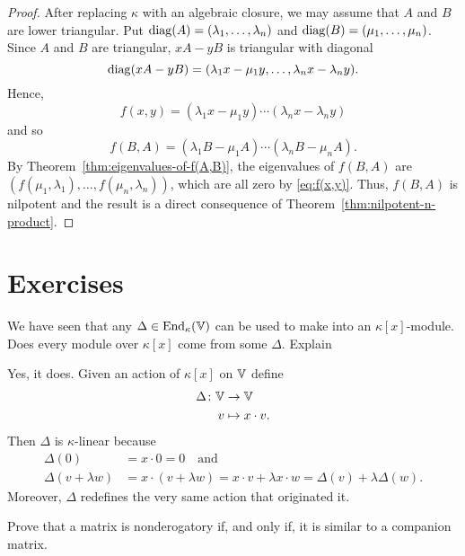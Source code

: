 \begin{proof}
    After replacing $\kappa$ with an algebraic closure, we may assume that $A$ and $B$ are lower triangular. Put ${\operatorname{diag}}(A)=(\lambda_1,\dots,\lambda_n)$ and ${\operatorname{diag}}(B)=(\mu_1,\dots,\mu_n)$. Since $A$ and $B$ are triangular, $xA-yB$ is triangular with diagonal
    $$
        \operatorname{diag}(xA-yB)=(\lambda_1x-\mu_1y,\dots,
            \lambda_nx-\lambda_ny).
    $$
    Hence,
    \begin{equation}\label{eq:f(x,y)}
        f(x,y)=(\lambda_1x-\mu_1y)\cdots
            (\lambda_nx-\lambda_ny)    
    \end{equation}
    and so
    $$
        f(B,A) = (\lambda_1B-\mu_1A)
            \cdots(\lambda_nB-\mu_nA).
    $$
    By Theorem~\ref{thm:eigenvalues-of-f(A,B)}, the eigenvalues of $f(B,A)$ are $(f(\mu_1,\lambda_1),\dots,f(\mu_n,\lambda_n))$, which are all zero by \eqref{eq:f(x,y)}. Thus, $f(B,A)$ is nilpotent and the result is a direct consequence of Theorem~\ref{thm:nilpotent-n-product}.
    
\end{proof}

\section{Exercises}

\begin{exr}
    We have seen that any $\Delta\in{\operatorname{End}}_\kappa(\mathbb V)$ can be used to make into an $\kappa[x]$-module. Does every module over $\kappa[x]$ come from some $\Delta$. Explain
\end{exr}

\begin{solution}
    Yes, it does. Given an action of $\kappa[x]$ on $\mathbb V$ define
    \begin{align*}
        \Delta\colon\mathbb V&\to\mathbb V\\
        v&\mapsto x\cdot v.
    \end{align*}
    Then $\Delta$ is $\kappa$-linear because
    \begin{align*}
        \Delta(0) &= x\cdot 0=0\quad\text{and}\\
        \Delta(v+\lambda w) &= x\cdot(v+\lambda w)=x\cdot v+\lambda x\cdot w = \Delta(v)+\lambda\Delta(w).
    \end{align*}
    Moreover, $\Delta$ redefines the very same action that originated it.
\end{solution}

\begin{exr}
    Prove that a matrix is nonderogatory if, and only if, it is similar to a companion matrix.
\end{exr}

